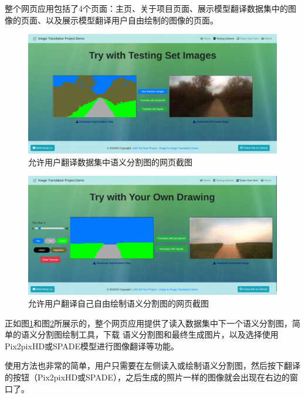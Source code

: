 \documentclass[supercite]{HustGraduPaper}
\theoremstyle{definition}
\begin{document}
整个网页应用包括了4个页面：主页、关于项目页面、展示模型翻译数据集中的图像的页面、以及展示模型翻译用户自由绘制的图像的页面。
\begin{figure}[H]
  \begin{center}
  \includegraphics[width=14cm]{images/GUI-testset}
  \end{center}
  \caption{允许用户翻译数据集中语义分割图的网页截图}
  \label{fig:GUI-testset}
\end{figure}

\begin{figure}[H]
  \begin{center}
  \includegraphics[width=14cm]{images/GUI-draw}
  \end{center}
  \caption{允许用户翻译自己自由绘制语义分割图的网页截图}
  \label{fig:GUI-draw}
\end{figure}

正如图\ref{fig:GUI-testset}和图\ref{fig:GUI-draw}所展示的，整个网页应用提供了读入数据集中下一个语义分割图，简单的语义分割图绘制工具，下载
语义分割图和最终生成图片，以及选择使用Pix2pixHD或SPADE模型进行图像翻译等功能。

使用方法也非常的简单，用户只需要在左侧读入或绘制语义分割图，然后按下翻译的按钮（Pix2pixHD或SPADE），之后生成的照片一样的图像就会出现在右边的窗口了。
\end{document}
